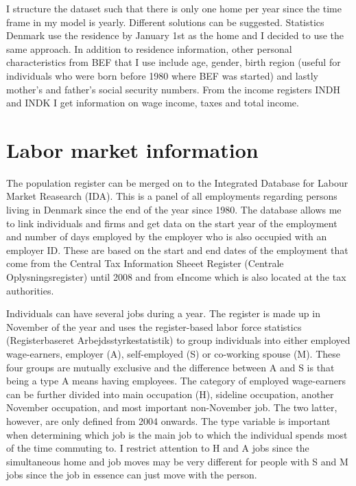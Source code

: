 I structure the dataset such that there is only one home per year since the time frame in my model is yearly. Different solutions can be suggested. Statistics Denmark use the residence by January 1st as the home and I decided to use the same approach. In addition to residence information, other personal characteristics from BEF that I use include age, gender, birth region (useful for individuals who were born before 1980 where BEF was started) and lastly mother's and father's social security numbers. From the income registers INDH and INDK I get information on wage income, taxes and total income.

\section{Labor market information}
The population register can be merged on to the Integrated Database for Labour Market Reasearch (IDA). This is a panel of all employments regarding persons living in Denmark since the end of the year since 1980. The database allows me to link individuals and firms and get data on the start year of the employment and number of days employed by the employer who is also occupied with an employer ID. These are based on the start and end dates of the employment that come from the Central Tax Information Sheeet Register (Centrale Oplysningsregister) until 2008 and from eIncome which is also located at the tax authorities. 

Individuals can have several jobs during a year. The register is made up in November of the year and uses the register-based labor force statistics (Registerbaseret Arbejdsstyrkestatistik) to group individuals into either employed wage-earners, employer (A), self-employed (S) or co-working spouse (M). These four groups are mutually exclusive and the difference between A and S is that being a type A means having employees. The category of employed wage-earners can be further divided into main occupation (H), sideline occupation, another November occupation, and most important non-November job. The two latter, however, are only defined from 2004 onwards. The type variable is important when determining which job is the main job to which the individual spends most of the time commuting to. I restrict attention to H and A jobs since the simultaneous home and job moves may be very different for people with S and M jobs since the job in essence can just move with the person. 

